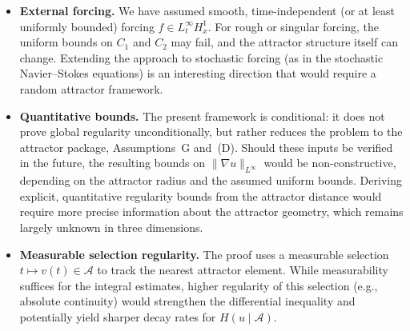 \documentclass[12pt,a4paper]{article}
\theoremstyle{definition}
\theoremstyle{plain}
\theoremstyle{remark}
\begin{document}
\begin{itemize}
    \item \textbf{External forcing.} We have assumed smooth, time-independent (or at least uniformly bounded) forcing $f \in L^\infty_t H^1_x$. For rough or singular forcing, the uniform bounds on $C_1$ and $C_2$ may fail, and the attractor structure itself can change. Extending the approach to stochastic forcing (as in the stochastic Navier--Stokes equations) is an interesting direction that would require a random attractor framework.

    \item \textbf{Quantitative bounds.} The present framework is conditional: it does not prove global regularity unconditionally, but rather reduces the problem to the attractor package, Assumptions~G and~(D). Should these inputs be verified in the future, the resulting bounds on $\|\nabla u\|_{L^\infty}$ would be non-constructive, depending on the attractor radius and the assumed uniform bounds. Deriving explicit, quantitative regularity bounds from the attractor distance would require more precise information about the attractor geometry, which remains largely unknown in three dimensions.

    \item \textbf{Measurable selection regularity.} The proof uses a measurable selection $t \mapsto v(t) \in \mathcal{A}$ to track the nearest attractor element. While measurability suffices for the integral estimates, higher regularity of this selection (e.g., absolute continuity) would strengthen the differential inequality and potentially yield sharper decay rates for $H(u \mid \mathcal{A})$.
\end{itemize}
\end{document}

